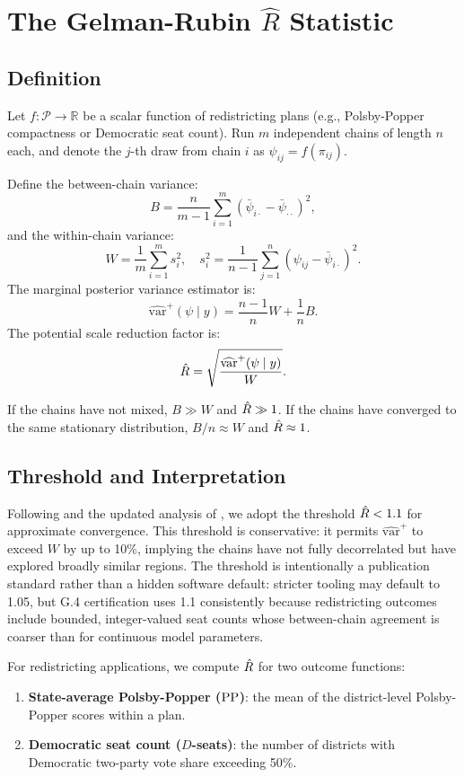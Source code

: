 \section{The Gelman-Rubin $\hat{R}$ Statistic}
\label{sec:rhat}

\subsection{Definition}

Let $f : \mathcal{P} \to \mathbb{R}$ be a scalar function of
redistricting plans (e.g., Polsby-Popper compactness or Democratic
seat count).
Run $m$ independent \recom{} chains of length $n$ each, and denote
the $j$-th draw from chain $i$ as $\psi_{ij} = f(\pi_{ij})$.

Define the between-chain variance:
\[
  B = \frac{n}{m-1} \sum_{i=1}^m \left(\bar{\psi}_{i\cdot} - \bar{\psi}_{\cdot\cdot}\right)^2,
\]
and the within-chain variance:
\[
  W = \frac{1}{m} \sum_{i=1}^m s_i^2, \quad
  s_i^2 = \frac{1}{n-1}\sum_{j=1}^n \left(\psi_{ij} - \bar{\psi}_{i\cdot}\right)^2.
\]
The marginal posterior variance estimator is:
\[
  \widehat{\mathrm{var}}^+(\psi \mid y) = \frac{n-1}{n} W + \frac{1}{n} B.
\]
The potential scale reduction factor is:
\[
  \hat{R} = \sqrt{\frac{\widehat{\mathrm{var}}^+(\psi \mid y)}{W}}.
\]

If the chains have not mixed, $B \gg W$ and $\hat{R} \gg 1$.
If the chains have converged to the same stationary distribution,
$B / n \approx W$ and $\hat{R} \approx 1$.

\subsection{Threshold and Interpretation}

Following \citet{gelman1992} and the updated analysis of \citet{vehtari2021},
we adopt the threshold $\hat{R} < 1.1$ for approximate convergence.
This threshold is conservative: it permits $\widehat{\mathrm{var}}^+$ to
exceed $W$ by up to 10\%, implying the chains have not fully decorrelated
but have explored broadly similar regions.
The threshold is intentionally a publication standard rather than a hidden
software default: stricter tooling may default to 1.05, but G.4 certification
uses 1.1 consistently because redistricting outcomes include bounded,
integer-valued seat counts whose between-chain agreement is coarser than for
continuous model parameters.

For redistricting applications, we compute $\hat{R}$ for two outcome
functions:
\begin{enumerate}
\item \textbf{State-average Polsby-Popper ($\mathrm{PP}$)}: the mean of the
      district-level Polsby-Popper scores within a plan.
\item \textbf{Democratic seat count ($D$-seats)}: the number of districts
      with Democratic two-party vote share exceeding 50\%.
\end{enumerate}

